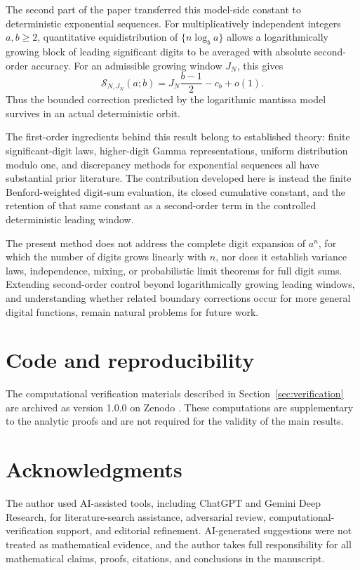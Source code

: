 \documentclass[11pt]{article}
\theoremstyle{definition}
\theoremstyle{remark}
\begin{document}
The second part of the paper transferred this model-side constant to
deterministic exponential sequences.  For multiplicatively independent
integers \(a,b\ge2\), quantitative equidistribution of
\(\{n\log_b a\}\) allows a logarithmically growing block of leading
significant digits to be averaged with absolute second-order accuracy.
For an admissible growing window \(J_N\), this gives
\[
\boxed{
    \mathcal S_{N,J_N}(a;b)
    =
    J_N\frac{b-1}{2}
    -
    c_b
    +
    o(1).
}
\]
Thus the bounded correction predicted by the logarithmic mantissa
model survives in an actual deterministic orbit.

The first-order ingredients behind this result belong to established
theory: finite significant-digit laws, higher-digit Gamma
representations, uniform distribution modulo one, and discrepancy
methods for exponential sequences all have substantial prior
literature.  The contribution developed here is instead the finite
Benford-weighted digit-sum evaluation, its closed cumulative constant,
and the retention of that same constant as a second-order term in the
controlled deterministic leading window.

The present method does not address the complete digit expansion of
\(a^n\), for which the number of digits grows linearly with \(n\),
nor does it establish variance laws, independence, mixing, or
probabilistic limit theorems for full digit sums.  Extending
second-order control beyond logarithmically growing leading windows,
and understanding whether related boundary corrections occur for more
general digital functions, remain natural problems for future work.

\section*{Code and reproducibility}

The computational verification materials described in
Section~\ref{sec:verification} are archived as version 1.0.0 on Zenodo
\cite{Dhoundiyal2026Reproducibility}. These computations are
supplementary to the analytic proofs and are not required for the
validity of the main results.

\section*{Acknowledgments}

The author used AI-assisted tools, including ChatGPT and Gemini Deep
Research, for literature-search assistance, adversarial review,
computational-verification support, and editorial refinement.
AI-generated suggestions were not treated as mathematical evidence,
and the author takes full responsibility for all mathematical claims,
proofs, citations, and conclusions in the manuscript.



\end{document}
